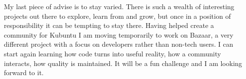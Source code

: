 My last piece of advise is to stay varied. There is such a wealth of interesting
projects out there to explore, learn from and grow, but once in a position of
responsibility it can be tempting to stay there. Having helped create a
community for Kubuntu I am moving temporarily to work on Bazaar, a very
different project with a focus on developers rather than non-tech users. I can
start again learning how code turns into useful reality, how a community
interacts, how quality is maintained. It will be a fun challenge and I am
looking forward to it.
